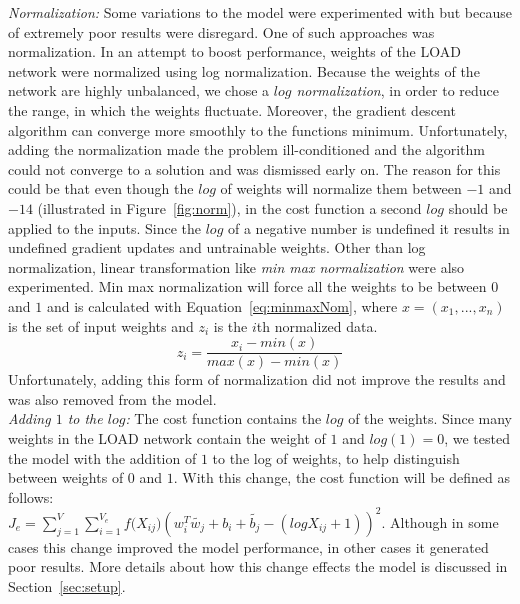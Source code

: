 \noindent
\emph{Normalization:} Some variations to the model were experimented with but because of extremely poor results were disregard. One of such approaches was normalization. In an attempt to boost performance, weights of the  LOAD network were normalized using log normalization.  Because the weights of the network are highly unbalanced, we chose a \emph{$log$ normalization}, in order to reduce the range, in which the weights fluctuate. Moreover, the gradient descent algorithm can converge more smoothly to the functions minimum. Unfortunately, adding the normalization made the problem ill-conditioned and the algorithm could not converge to a solution and was dismissed early on. The reason for this could be that even though the $log$ of weights will normalize them between $-1$ and  $-14$ (illustrated in Figure~\ref{fig:norm}), in the cost function a second $log$ should be applied to the inputs. Since the $log$ of a negative number is undefined it results in undefined gradient updates and untrainable weights. Other than log normalization, linear transformation like \emph{min max normalization} were also experimented. Min max normalization will force all the weights to be between $0$ and $1$ and is calculated with Equation~\ref{eq:minmaxNom}, where $x=(x_1,...,x_n)$ is the set of input weights and $z_i$ is the $i$th normalized data. 
\begin{equation}
z_{ i }=\frac { x_{ i }-min(x) }{ max(x)-min(x) } 
\label{eq:minmaxNom}
\end{equation}
Unfortunately, adding this form of normalization did not improve the results and was also removed from the model. \\
\noindent
\emph{Adding $1$ to the $log$:} The cost function contains the $log$ of the weights. Since many weights in the LOAD network contain the weight of $1$  and $log(1)=0$, we tested the model with the addition of $1$ to the log of weights, to help distinguish between weights of $0$ and $1$. With this change, the cost function will be defined as follows:\\
$J_e=\sum _{ j=1 }^{ V }{}\sum _{ i=1 }^{ V_e }{ f({ X }_{ ij } } )(w_{ i }^{ T }\tilde{  w_{ j } } +b_{ i }+\tilde{  b_{ j } } -(log{ X }_{ ij }+1))^2$. Although in some cases this change improved the model performance, in other cases it generated poor results. More details about how this change effects the model is discussed in Section~\ref{sec:setup}. 


